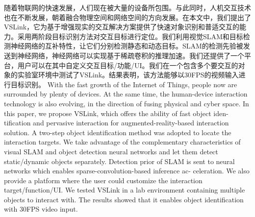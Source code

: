 \cleardoublepage
{}
随着物联网的快速发展，人们现在被大量的设备所包围。与此同时，人机交互技术也在不断发展，朝着融合物理空间和网络空间的方向发展。在本文中，我们提出了VSLink，它为基于增强现实的交互解决方案提供了快速对象识别和普适交互的能力。采用两阶段目标识别方法对交互目标进行定位。我们利用视觉SLAM和目标检测神经网络的互补特性，让它们分别检测静态和动态目标。SLAM的检测先验被发送到神经网络，神经网络可以实现基于稀疏卷积的推理加速。我们还提供了一个平台，用户可以在其中自定义交互目标/功能/UI。我们在一个包含多个要交互的对象的实验室环境中测试了VSLink。结果表明，该方法能够以30FPS的视频输入进行目标识别。
\cleardoublepage
{}
With the fast growth of the Internet of Things, people now are surrounded by plenty of devices. At the same time, the human-device interaction technology is also evolving, in the direction of fusing physical and cyber space. In this paper, we propose VSLink, which offers the ability of fast object iden- tification and pervasive interaction for augmented-reality-based interaction solution. A two-step object identification method was adopted to locate the interaction targets. We take advantage of the complementary characteristics of visual SLAM and object detection neural networks and let them detect static/dynamic objects separately. Detection prior of SLAM is sent to neural networks which enables sparse-convolution-based inference ac- celeration. We also provide a platform where the user could customize the interaction target/function/UI. We tested VSLink in a lab environment containing multiple objects to interact with. The results showed that it enables object identification with 30FPS video input.